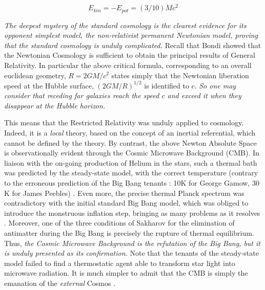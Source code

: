 \documentclass[a4paper,9pt]{article}
\newcounter{row}
\begin{document}
\begin{equation}\label{Eq2}
E_{kin} = - E_{pot} = (3/10) Mc^2 
 \end{equation}


\textit {The deepest mystery of the standard cosmology is the clearest evidence for its opponent simplest model, the non-relativist permanent Newtonian model, proving that the standard cosmology is unduly complicated.} Recall that Bondi \cite {Bondi} showed that the Newtonian Cosmology is sufficient to obtain the principal results of General Relativity. In particular the above critical formula, corresponding to an overall euclidean geometry, $R = 2GM/c^2$ states simply that the Newtonian liberation speed at the Hubble surface, $(2GM/R)^{1/2}$ is identified to $c$. \textit {So one may consider that receding far galaxies reach the speed $c$ and exceed it when they disappear at the Hubble horizon.}

This means that the Restricted Relativity was unduly applied to cosmology. Indeed, it is a \textit{local} theory, based on the concept of an inertial referential, which cannot be defined by the theory. By contrast, the above Newton Absolute Space is observationally evident through the Cosmic Microwave Background (CMB). In liaison with the on-going production of Helium in the stars, such a thermal bath was predicted by the steady-state model, with the correct temperature (contrary to the erroneous prediction of the Big Bang tenants : 10K for George Gamow, 30 K for James Peebles) \cite{Hoyle2}. Even more, the precise thermal Planck spectrum was contradictory with the initial standard Big Bang model, which was obliged to introduce the monstruous inflation step, bringing as many problems as it resolves \cite{Steinhardt}. Moreover, one of the three conditions of Sakharov \cite{Sakharov} for the elimination of antimatter during the Big Bang is precisely the rupture of thermal equilibrium. Thus, \textit {the Cosmic Microwave Background is the refutation of the Big Bang, but it is unduly presented as its confirmation.} Note that the tenants of the steady-state model failed to find a thermostatic agent able to transform star light into microwave radiation. It is much simpler to admit that the CMB is simply the emanation of the \textit {external} Cosmos \cite{Sanchez2}. 
\end{document}
